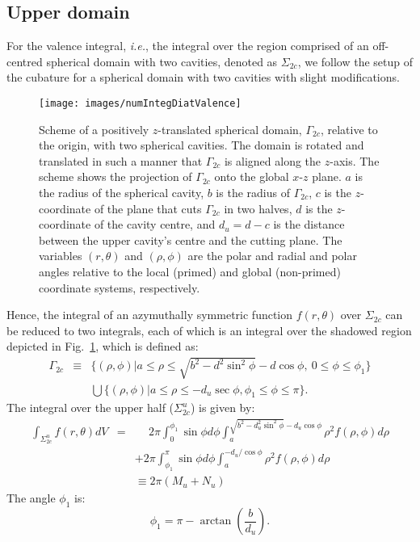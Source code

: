 \documentclass[11pt]{amsart}
\begin{document}
\subsection{Upper domain}
For the valence integral, \textit{i.e.}, the integral over the region comprised of an off-centred
spherical domain with two cavities, denoted as $\Sigma_{2c}$,
we follow the setup of the cubature for a spherical domain with two cavities with slight modifications.
%
\begin{figure}[htb!]
   \centering
   \texttt{[image: images/numIntegDiatValence]}
   \caption{Scheme of a positively $z$-translated spherical domain, $\Gamma_{2c}$,
   relative to the origin, with two spherical cavities.
   The domain is rotated and translated in such a manner that $\Gamma_{2c}$ is
   aligned along the $z$-axis. The scheme shows the projection of $\Gamma_{2c}$ onto the global 
   $x$-$z$ plane. $a$ is the radius of the spherical cavity, $b$ is the radius of $\Gamma_{2c}$,
   $c$ is the $z$-coordinate of the
   plane that cuts $\Gamma_{2c}$ in two halves, $d$ is the $z$-coordinate of the cavity centre,
   and $d_u=d-c$ is the distance
   between the upper cavity's centre and the cutting plane. The variables
   $(r,\theta)$ and $(\rho,\phi)$ are the polar and radial and polar angles
   relative to the local (primed) and global (non-primed) coordinate systems, respectively.}
   \label{fig:offcentsphdom2cav}
\end{figure}
%
Hence, the integral of an azymuthally symmetric function $f(r,\theta)$ over $\Sigma_{2c}$ can be reduced
to two integrals, each of which is an integral over the shadowed region depicted in Fig.~\ref{fig:offcentsphdom2cav}, which is
defined as:
%
\begin{eqnarray}
	\Gamma_{2c} & \equiv & \Big\{(\rho,\phi)|a\leq\rho\leq\sqrt{b^2-d^2\sin^2\phi}-d\cos\phi,
	\ 0\leq\phi\leq\phi_1\Big\}\\\nonumber
	 & & \bigcup\Big\{ (\rho,\phi) | a\leq\rho\leq-d_u\sec\phi,%
	 \phi_1\leq\phi\leq\pi \Big\}.
\end{eqnarray}
%
The integral over the upper half ($\Sigma_{2c}^{u}$) is given by:
%
\begin{eqnarray}
	\int_{\Sigma_{2c}^{u}}f(r,\theta)dV & = & \phantom{+}2\pi\int_0^{\phi_1}\sin\phi d\phi
		\int_a^{\sqrt{b^2-d_u^2\sin^2\phi}-d_u\cos\phi}\rho^2f(\rho,\phi)d\rho\\\nonumber
		 & & +2\pi\int_{\phi_1}^{\pi}\sin\phi d\phi\int_{a}^{-d_u/\cos\phi}\rho^2f(\rho,\phi)d\rho\\\nonumber
		 & & \equiv 2\pi(M_u+N_u)
\end{eqnarray}
%
The angle $\phi_1$ is:
%
\begin{equation}
	\phi_1=\pi-\arctan\left(\frac{b}{d_u}\right).
\end{equation}
%
\end{document}
